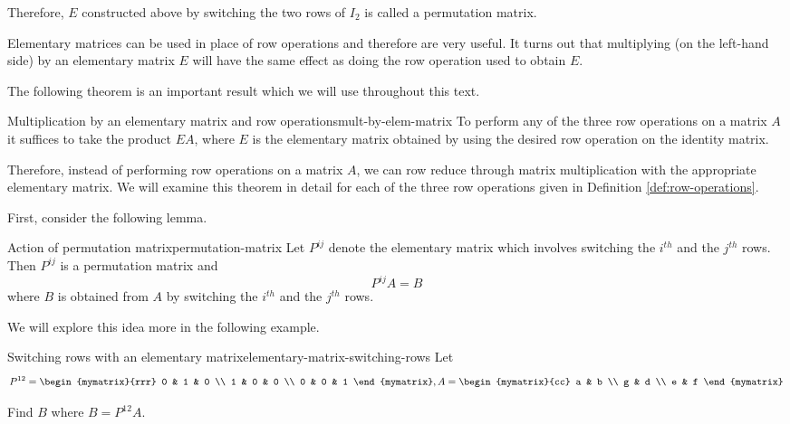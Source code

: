 Therefore, $E$ constructed above by switching the two rows of $I_2$ is called a permutation matrix. 

Elementary matrices can be used in place of row operations and therefore are very useful. It turns
out that multiplying (on the left-hand side) by an elementary matrix $E$ will have the
same effect as doing the row operation used to obtain $E$.

The following theorem is an important result which we will use throughout this text. 

\begin{theorem}{Multiplication by an elementary matrix and row operations}{mult-by-elem-matrix}
To perform any of the three row operations on a matrix $A$
it suffices to take the product $EA$, where $E$ is the elementary matrix obtained by 
using the desired row operation on the identity matrix.
\end{theorem}

Therefore, instead of performing row operations on a matrix $A$, we
can row reduce through matrix multiplication with the appropriate
elementary matrix. We will examine this theorem in detail for each of
the three row operations given in Definition \ref{def:row-operations}.

First, consider the following lemma.

\begin{lemma}{Action of permutation matrix}{permutation-matrix}
Let $P^{ij}$ denote the elementary matrix which involves
switching the $i^{th}$ and the $j^{th}$ rows. Then $P^{ij}$ is a permutation matrix and 
\begin{equation*}
P^{ij}A=B
\end{equation*}
where $B$ is obtained from $A$ by switching the $i^{th}$ and the $j^{th}$
rows.
\end{lemma}

We will explore this idea more in the following example.

\begin{example}{Switching rows with an elementary matrix}{elementary-matrix-switching-rows}
Let
\begin{equation*}
P^{12} = \begin{mymatrix}{rrr}
0 & 1 & 0 \\
1 & 0 & 0 \\
0 & 0 & 1
\end{mymatrix}, A = \begin{mymatrix}{cc}
a & b \\
g & d \\
e & f
\end{mymatrix} 
\end{equation*}

Find $B$ where $B = P^{12}A$.
\end{example}


